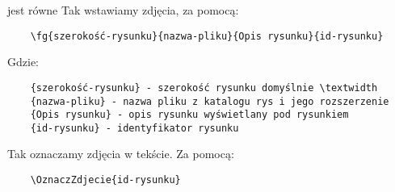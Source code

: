 
jest równe 
\clearpage
Tak wstawiamy zdjęcia, za pomocą:

  \begin{verbatim}
	\fg{szerokość-rysunku}{nazwa-pliku}{Opis rysunku}{id-rysunku} 
 \end{verbatim}

 Gdzie:
\begin{verbatim}
	{szerokość-rysunku} - szerokość rysunku domyślnie \textwidth
	{nazwa-pliku} - nazwa pliku z katalogu rys i jego rozszerzenie
	{Opis rysunku} - opis rysunku wyświetlany pod rysunkiem
	{id-rysunku} - identyfikator rysunku
\end{verbatim}

 Tak oznaczamy zdjęcia  w tekście. Za pomocą:

  \begin{verbatim}
	\OznaczZdjecie{id-rysunku}
	\end{verbatim}



